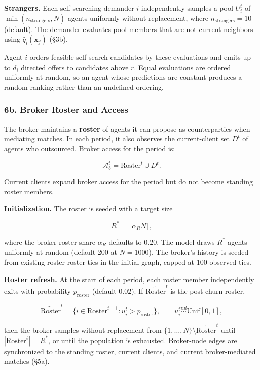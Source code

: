 \documentclass[11pt]{article}
\begin{document}
\textbf{Strangers.} Each self-searching demander \(i\) independently samples a pool \(U_i^t\) of \(\min(n_{\mathrm{strangers}}, N)\) agents uniformly without replacement, where \(n_{\mathrm{strangers}} = 10\) (default). The demander evaluates pool members that are not current neighbors using \(\hat{q}_i(\mathbf{x}_j)\) (§3b).

Agent \(i\) orders feasible self-search candidates by these evaluations and emits up to \(d_i\) directed offers to candidates above \(r\). Equal evaluations are ordered uniformly at random, so an agent whose predictions are constant produces a random ranking rather than an undefined ordering.

\subsubsection{6b. Broker Roster and Access}\label{b.-broker-roster-and-access}

The broker maintains a \textbf{roster} of agents it can propose as counterparties when mediating matches. In each period, it also observes the current-client set \(D^t\) of agents who outsourced. Broker access for the period is:

\[\mathcal{A}_b^t = \text{Roster}^t \cup D^t.\]

Current clients expand broker access for the period but do not become standing roster members.

\textbf{Initialization.} The roster is seeded with a target size

\[R^* = \lceil \alpha_R N \rceil,\]

where the broker roster share \(\alpha_R\) defaults to 0.20. The model draws \(R^*\) agents uniformly at random (default 200 at \(N = 1000\)). The broker's history is seeded from existing roster-roster ties in the initial graph, capped at 100 observed ties.

\textbf{Roster refresh.} At the start of each period, each roster member independently exits with probability \(p_{\text{roster}}\) (default \(0.02\)). If \(\widetilde{\text{Roster}}^t\) is the post-churn roster,

\[\widetilde{\text{Roster}}^t = \{i \in \text{Roster}^{t-1} : u_i^t > p_{\text{roster}}\}, \qquad u_i^t \overset{iid}{\sim} \mathrm{Unif}[0,1],\]

then the broker samples without replacement from \(\{1,\ldots,N\}\setminus \widetilde{\text{Roster}}^t\) until \(|\text{Roster}^t| = R^*\), or until the population is exhausted. Broker-node edges are synchronized to the standing roster, current clients, and current broker-mediated matches (§5a).
\end{document}
